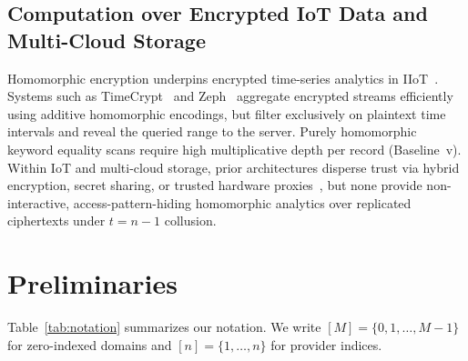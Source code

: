 \documentclass[11pt,a4paper]{article}
\begin{document}
\subsection{Computation over Encrypted IoT Data and Multi-Cloud Storage}
Homomorphic encryption underpins encrypted time-series analytics in IIoT~\cite{halder2022,kamble2024}. Systems such as TimeCrypt~\cite{burkhalter2020} and Zeph~\cite{burkhalter2021} aggregate encrypted streams efficiently using additive homomorphic encodings, but filter exclusively on plaintext time intervals and reveal the queried range to the server. Purely homomorphic keyword equality scans require high multiplicative depth per record (Baseline~v). Within IoT and multi-cloud storage, prior architectures disperse trust via hybrid encryption, secret sharing, or trusted hardware proxies~\cite{xu2019,wu2024,verma2025,bharot2025,muthuvel2026,wang2020,horkos2026,poddar2019,crooks2018,dauterman2021}, but none provide non-interactive, access-pattern-hiding homomorphic analytics over replicated ciphertexts under $t = n - 1$ collusion.

\section{Preliminaries}\label{sec:prelim}

Table~\ref{tab:notation} summarizes our notation. We write $[M] = \{0, 1, \dots, M-1\}$ for zero-indexed domains and $[n] = \{1, \dots, n\}$ for provider indices.
\end{document}
